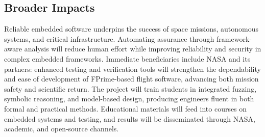 \documentclass[11pt]{article}
\begin{document}
\subsection*{Broader Impacts}

Reliable embedded software underpins the success of space missions, autonomous systems, and critical infrastructure. Automating assurance through framework-aware analysis will reduce human effort while improving reliability and security in complex embedded frameworks. Immediate beneficiaries include NASA and its partners: enhanced testing and verification tools will strengthen the dependability and ease of development of FPrime-based flight software, advancing both mission safety and scientific return. The project will train students in integrated fuzzing, symbolic reasoning, and model-based design, producing engineers fluent in both formal and practical methods. Educational materials will feed into courses on embedded systems and testing, and results will be disseminated through NASA, academic, and open-source channels. 
\end{document}
